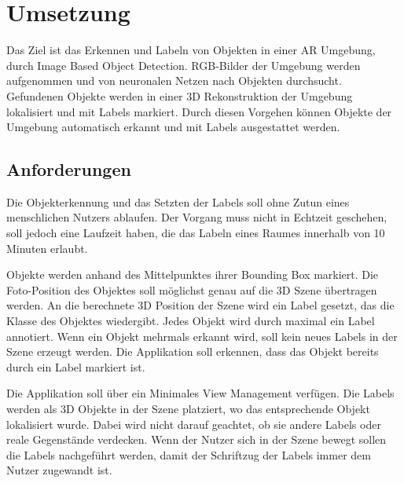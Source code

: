 \newpage
\section{Umsetzung}

Das Ziel ist das Erkennen und Labeln von Objekten in einer AR Umgebung, durch Image Based Object Detection. RGB-Bilder der Umgebung werden aufgenommen und von neuronalen Netzen nach Objekten durchsucht. Gefundenen Objekte werden in einer 3D Rekonstruktion der Umgebung lokalisiert und mit Labels markiert. Durch diesen Vorgehen können Objekte der Umgebung automatisch erkannt und mit Labels ausgestattet werden.

\subsection{Anforderungen}
Die Objekterkennung und das Setzten der Labels soll ohne Zutun eines menschlichen Nutzers ablaufen. Der Vorgang muss nicht in Echtzeit geschehen, soll jedoch eine Laufzeit haben, die das Labeln eines Raumes innerhalb von 10 Minuten erlaubt.

Objekte werden anhand des Mittelpunktes ihrer Bounding Box markiert. Die Foto-Position des Objektes soll möglichst genau auf die 3D Szene übertragen werden. An die berechnete 3D Position der Szene wird ein Label gesetzt, das die Klasse des Objektes wiedergibt. Jedes Objekt wird durch maximal ein Label annotiert. Wenn ein Objekt mehrmals erkannt wird, soll kein neues Labels in der Szene erzeugt werden. Die Applikation soll erkennen, dass das Objekt bereits durch ein Label markiert ist.

Die Applikation soll über ein Minimales View Management verfügen. Die Labels werden als 3D Objekte in der Szene platziert, wo das entsprechende Objekt lokalisiert wurde. Dabei wird nicht darauf geachtet, ob sie andere Labels oder reale Gegenstände verdecken. Wenn der Nutzer sich in der Szene bewegt sollen die Labels nachgeführt werden, damit der Schriftzug der Labels immer dem Nutzer zugewandt ist.


